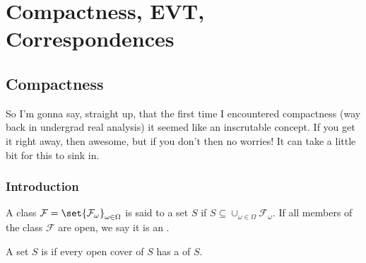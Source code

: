 \documentclass{article}
\begin{document}
\displayoptions

\section{Compactness, EVT, Correspondences}
\label{sec:compactness_evt_correspondences}

\localtableofcontents

\subsection{Compactness}
\label{sub:compactness}

So I'm gonna say, straight up, that the first time I encountered compactness (way back in undergrad real analysis) it seemed like an inscrutable concept. If you get it right away, then awesome, but if you don't then no worries! It can take a little bit for this to sink in.

\subsubsection{Introduction}
\label{ssub:introduction}

\begin{definition}[cover]\label{def:lecture3_compactness_cover}
  A class $\mathcal{F} = \set{\mathcal{F}_\omega}_{\omega \in \Omega}$ is said to  a set $S$ if $S \subseteq \cup_{\omega \in \Omega} \mathcal{F}_\omega$. If all members of the class $\mathcal{F}$ are open, we say it is an .
\end{definition}

\begin{definition}[compactness]\label{def:lecture3_compactness_compact}
  A set $S$ is  if every open cover of $S$ has a  of $S$.
\end{definition}
\end{document}
